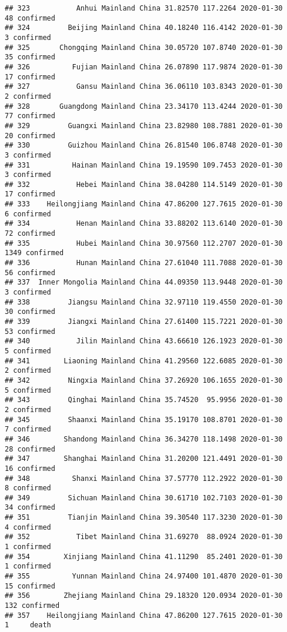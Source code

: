 \documentclass[
]{article}
\begin{document}
\begin{verbatim}
## 323           Anhui Mainland China 31.82570 117.2264 2020-01-30    48 confirmed
## 324         Beijing Mainland China 40.18240 116.4142 2020-01-30     3 confirmed
## 325       Chongqing Mainland China 30.05720 107.8740 2020-01-30    35 confirmed
## 326          Fujian Mainland China 26.07890 117.9874 2020-01-30    17 confirmed
## 327           Gansu Mainland China 36.06110 103.8343 2020-01-30     2 confirmed
## 328       Guangdong Mainland China 23.34170 113.4244 2020-01-30    77 confirmed
## 329         Guangxi Mainland China 23.82980 108.7881 2020-01-30    20 confirmed
## 330         Guizhou Mainland China 26.81540 106.8748 2020-01-30     3 confirmed
## 331          Hainan Mainland China 19.19590 109.7453 2020-01-30     3 confirmed
## 332           Hebei Mainland China 38.04280 114.5149 2020-01-30    17 confirmed
## 333    Heilongjiang Mainland China 47.86200 127.7615 2020-01-30     6 confirmed
## 334           Henan Mainland China 33.88202 113.6140 2020-01-30    72 confirmed
## 335           Hubei Mainland China 30.97560 112.2707 2020-01-30  1349 confirmed
## 336           Hunan Mainland China 27.61040 111.7088 2020-01-30    56 confirmed
## 337  Inner Mongolia Mainland China 44.09350 113.9448 2020-01-30     3 confirmed
## 338         Jiangsu Mainland China 32.97110 119.4550 2020-01-30    30 confirmed
## 339         Jiangxi Mainland China 27.61400 115.7221 2020-01-30    53 confirmed
## 340           Jilin Mainland China 43.66610 126.1923 2020-01-30     5 confirmed
## 341        Liaoning Mainland China 41.29560 122.6085 2020-01-30     2 confirmed
## 342         Ningxia Mainland China 37.26920 106.1655 2020-01-30     5 confirmed
## 343         Qinghai Mainland China 35.74520  95.9956 2020-01-30     2 confirmed
## 345         Shaanxi Mainland China 35.19170 108.8701 2020-01-30     7 confirmed
## 346        Shandong Mainland China 36.34270 118.1498 2020-01-30    28 confirmed
## 347        Shanghai Mainland China 31.20200 121.4491 2020-01-30    16 confirmed
## 348          Shanxi Mainland China 37.57770 112.2922 2020-01-30     8 confirmed
## 349         Sichuan Mainland China 30.61710 102.7103 2020-01-30    34 confirmed
## 351         Tianjin Mainland China 39.30540 117.3230 2020-01-30     4 confirmed
## 352           Tibet Mainland China 31.69270  88.0924 2020-01-30     1 confirmed
## 354        Xinjiang Mainland China 41.11290  85.2401 2020-01-30     1 confirmed
## 355          Yunnan Mainland China 24.97400 101.4870 2020-01-30    15 confirmed
## 356        Zhejiang Mainland China 29.18320 120.0934 2020-01-30   132 confirmed
## 357    Heilongjiang Mainland China 47.86200 127.7615 2020-01-30     1     death

\end{verbatim}
\end{document}
